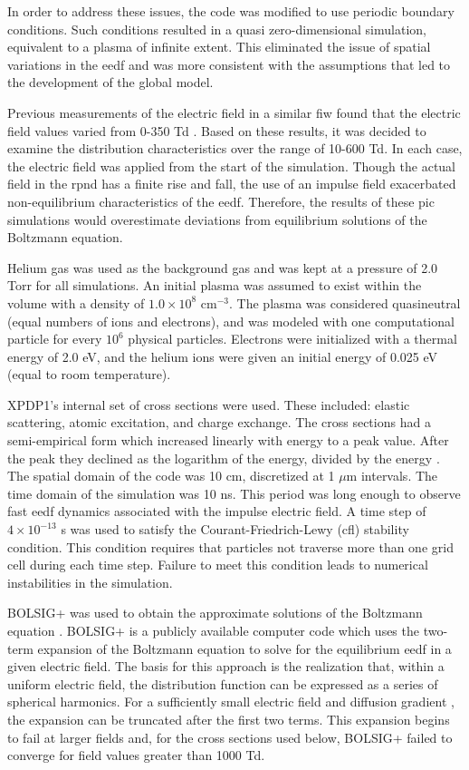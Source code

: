 In order to address these issues, the code was modified to use periodic boundary
conditions. Such conditions resulted in a quasi zero-dimensional simulation,
equivalent to a plasma of infinite extent. This eliminated the issue of spatial
variations in the \acs{eedf} and was more consistent with the assumptions that
led to the development of the global model.

Previous measurements of the electric field in a similar \acs{fiw} found that
the electric field values varied from 0-350 Td \cite{Takashima2011}. Based on
these results, it was decided to examine the distribution characteristics over
the range of 10-600 Td. In each case, the electric field was applied from the
start of the simulation. Though the actual field in the \acs{rpnd} has a finite
rise and fall, the use of an impulse field exacerbated non-equilibrium
characteristics of the \acs{eedf}. Therefore, the results of these \acs{pic}
simulations would overestimate deviations from equilibrium solutions of the
Boltzmann equation.

Helium gas was used as the background gas and was kept at a pressure of 2.0 Torr
for all simulations. An initial plasma was assumed to exist within the volume
with a density of $1.0\times10^{8}$ cm$^{-3}$. The plasma was considered
quasineutral (equal numbers of ions and electrons), and was modeled with one
computational particle for every $10^6$ physical particles. Electrons were
initialized with a thermal energy of 2.0 eV, and the helium ions were given an
initial energy of 0.025 eV (equal to room temperature).

XPDP1's internal set of cross sections were used. These included: elastic
scattering, atomic excitation, and charge exchange. The cross sections had a
semi-empirical form which increased linearly with energy to a peak value. After
the peak they declined as the logarithm of the energy, divided by the energy
\cite{Verboncoeur1993}. The spatial domain of the code was 10 cm, discretized at
1 $\mu$m intervals. The time domain of the simulation was 10 ns. This period was
long enough to observe fast \acs{eedf} dynamics associated with the impulse
electric field. A time step of $4\times10^{-13}$ s was used to satisfy the
Courant-Friedrich-Lewy (\acs{cfl}) stability condition. This condition requires
that particles not traverse more than one grid cell during each time step.
Failure to meet this condition leads to numerical instabilities in the
simulation.

BOLSIG+ was used to obtain the approximate solutions of the Boltzmann equation
\cite{Hagelaar2005}. BOLSIG+ is a publicly available computer code which uses
the two-term expansion of the Boltzmann equation to solve for the equilibrium
\acs{eedf} in a given electric field. The basis for this approach is the
realization that, within a uniform electric field, the distribution function can
be expressed as a series of spherical harmonics. For a sufficiently small
electric field and diffusion gradient \cite{Holstein1946}, the expansion can be
truncated after the first two terms. This expansion begins to fail at larger
fields \cite{Allis1982} and, for the cross sections used below, BOLSIG+ failed
to converge for field values greater than 1000 Td.

